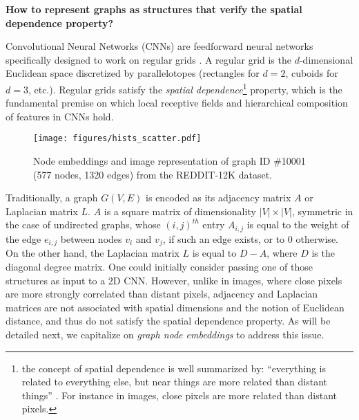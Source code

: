 \documentclass[sigconf]{acmart}
\begin{document}
\noindent \textbf{How to represent graphs as structures that verify the spatial dependence property?}
\par Convolutional Neural Networks (CNNs) are feedforward neural networks specifically designed to work on regular grids \citep{lecun1998gradient}. A regular grid is the $d$-dimensional Euclidean space discretized by parallelotopes (rectangles for $d=2$, cuboids for $d=3$, etc.). %
Regular grids satisfy the \textit{spatial dependence}\footnote{\scriptsize{the concept of spatial dependence is well summarized by:
``everything is related to everything else, but near things are more related than distant things'' \citep{tobler1970computer}. For instance in images, close pixels are more related than distant pixels.}} property, which is the fundamental premise on which local receptive fields and hierarchical composition of features in CNNs hold.

\begin{figure*}[!ht]
  \centering
    \texttt{[image: figures/hists\_scatter.pdf]}
\captionsetup{justification=justified,singlelinecheck=false, size=small}
    \caption{Node embeddings and image representation of graph ID \#10001 (577 nodes, 1320 edges) from the REDDIT-12K dataset.}
    \label{fig:hist_scatter}
\end{figure*}


\par Traditionally, a graph $G(V,E)$ is encoded as its adjacency matrix $A$ or Laplacian matrix $L$. $A$ is a square matrix of dimensionality $|V| \times |V|$, symmetric in the case of undirected graphs, whose $(i,j)^{th}$ entry $A_{i,j}$ is equal to the weight of the edge $e_{i,j}$ between nodes $v_{i}$ and $v_{j}$, if such an edge exists, or to 0 otherwise. On the other hand, the Laplacian matrix $L$ is equal to $D-A$, where $D$ is the diagonal degree matrix. One could initially consider passing one of those structures as input to a 2D CNN. However, unlike in images, where close pixels are more strongly correlated than distant pixels, adjacency and Laplacian matrices are not associated with spatial dimensions and the notion of Euclidean distance, and thus do not satisfy the spatial dependence property. As will be detailed next, we capitalize on \textit{graph node embeddings} to address this issue.\\
\end{document}
